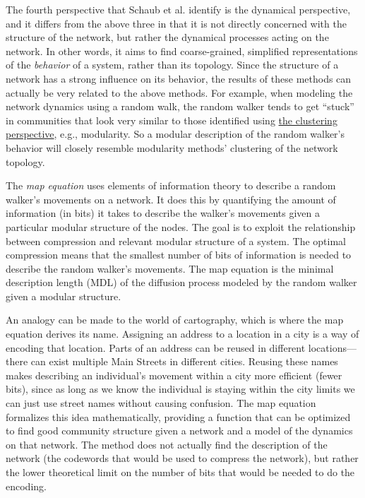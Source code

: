 The fourth perspective that Schaub et al. identify is the dynamical
perspective, and it differs from the above three in that it is not
directly concerned with the structure of the network, but rather the
dynamical processes acting on the network. In other words, it aims to
find coarse-grained, simplified representations of the \emph{behavior}
of a system, rather than its topology. Since the structure of a network
has a strong influence on its behavior, the results of these methods can
actually be very related to the above methods. For example, when
modeling the network dynamics using a random walk, the random walker
tends to get ``stuck'' in communities that look very similar to those
identified using \protect\hyperlink{the-clustering-perspective}{the
clustering perspective}, e.g., modularity. So a modular description of
the random walker's behavior will closely resemble modularity methods'
clustering of the network topology.

The \emph{map equation} uses elements of information theory to describe
a random walker's movements on a network. It does this by quantifying
the amount of information (in bits) it takes to describe the walker's
movements given a particular modular structure of the nodes. The goal is
to exploit the relationship between compression and relevant modular
structure of a system. The optimal compression means that the smallest
number of bits of information is needed to describe the random walker's
movements. The map equation is the minimal description length (MDL) of
the diffusion process modeled by the random walker given a modular
structure.

An analogy can be made to the world of cartography, which is where the
map equation derives its name. Assigning an address to a location in a
city is a way of encoding that location. Parts of an address can be
reused in different locations---there can exist multiple Main Streets in
different cities. Reusing these names makes describing an individual's
movement within a city more efficient (fewer bits), since as long as we
know the individual is staying within the city limits we can just use
street names without causing confusion. The map equation formalizes this
idea mathematically, providing a function that can be optimized to find
good community structure given a network and a model of the dynamics on
that network. The method does not actually find the description of the
network (the codewords that would be used to compress the network), but
rather the lower theoretical limit on the number of bits that would be
needed to do the encoding.


